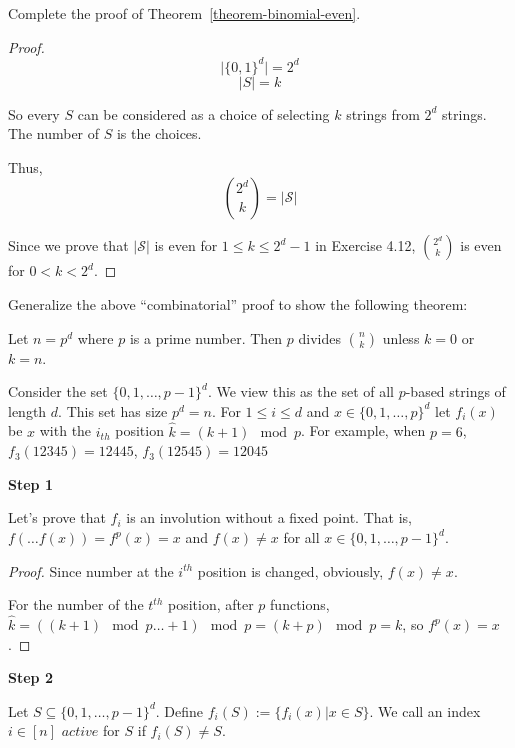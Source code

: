 
\begin{exercise}
  Complete the proof of Theorem~\ref{theorem-binomial-even}.
\end{exercise}

\begin{proof}
$$ \lvert \{0, 1\}^d \rvert = 2^d $$
$$ \lvert S \rvert = k $$ 

So every $ S $ can be considered as a choice of selecting $k$ strings from $2^d$ strings. The number of $S$ is the choices.

Thus, $${2^d \choose k} = \lvert \mathcal{S} \rvert$$ 

Since we prove that $\lvert \mathcal{S} \rvert$ is even for $1 \leq k \leq 2^d - 1$ in Exercise 4.12, ${2^d \choose k}$ is even for $0 < k < 2^d$.
\end{proof}



\begin{exerciseD}
  Generalize the above ``combinatorial'' proof to show the following theorem:
  \begin{theorem}
 Let $n = p^d$ where $p$ is a prime number. Then $p$ divides
 ${n \choose k}$ unless $k=0$ or $k=n$. 
 \end{theorem}
\end{exerciseD}


Consider the set $\{0,1, \dots, p-1\}^d$. We view this as the set of all $p$-based strings of length $d$. This set has size $p^d = n$. For $1 \leq i \leq d$ and $x \in \{0,1, \dots, p \}^d$ let $f_i(x)$ be $x$ with the $i_{th}$ position $\hat k = (k + 1) \mod p$. For example, when $p = 6 $, $f_3(12345) = 12445$, $f_3(12545)=12045$

\textbf{Step 1} 

Let's prove that $f_i$ is an involution without a fixed point. That is, $f(\dots f(x)) = f^p(x) = x$ and $f(x) \neq x$ for all $x \in \{0,1, \dots, p-1 \}^d$.

\begin{proof}
Since number at the $i^{th}$ position is changed, obviously, $f(x) \neq x$.

For the number of the $t^{th}$ position, after $p$ functions, $\hat k = ((k+1) \mod p \dots + 1) \mod p = (k + p) \mod p = k$, so $f^p(x) = x$.
\end{proof}

\textbf{Step 2} 

Let $S \subseteq \{0,1, \dots, p-1 \}^d$. Define $f_i(S) := \{ f_i(x) | x \in S\}$. We call an index $i \in [n]$ $active$ for $S$ if $f_i(S) \neq S$.


